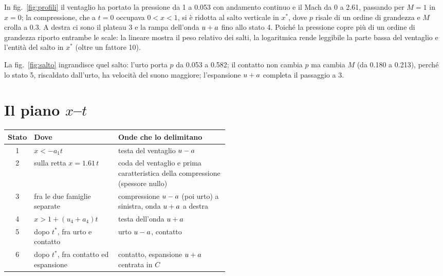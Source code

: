 
In fig.~\ref{fig:profili} il ventaglio ha portato la pressione da 1 a \num{0.053} con andamento continuo e il Mach
da 0 a \num{2.61}, passando per $M=1$ in $x=0$; la compressione, che a $t=0$ occupava $0<x<1$, si è ridotta al salto
verticale in $x^*$, dove $p$ risale di un ordine di grandezza e $M$ crolla a \num{0.3}. A destra ci sono il plateau
3 e la rampa dell'onda $u+a$ fino allo stato 4. Poiché la pressione copre più di un ordine di grandezza riporto
entrambe le scale: la lineare mostra il peso relativo dei salti, la logaritmica rende leggibile la parte bassa del
ventaglio e l'entità del salto in $x^*$ (oltre un fattore 10).


La fig.~\ref{fig:salto} ingrandisce quel salto: l'urto porta $p$ da \num{0.053} a \num{0.582}; il contatto non
cambia $p$ ma cambia $M$ (da \num{0.180} a \num{0.213}), perché lo stato 5, riscaldato dall'urto, ha velocità del
suono maggiore; l'espansione $u+a$ completa il passaggio a 3.

\section*{Il piano $x$--$t$}
\begin{table}[H]
  \centering
  \small
  \begin{tabular}{clp{0.5\linewidth}}
    \toprule
    Stato & Dove & Onde che lo delimitano \\
    \midrule
    1 & $x<-a_1t$ & testa del ventaglio $u-a$ \\
    2 & sulla retta $x=\num{1.61}\,t$ & coda del ventaglio e prima caratteristica della compressione (spessore nullo) \\
    3 & fra le due famiglie separate & compressione $u-a$ (poi urto) a sinistra, onda $u+a$ a destra \\
    4 & $x>1+(u_4+a_4)t$ & testa dell'onda $u+a$ \\
    5 & dopo $t^*$, fra urto e contatto & urto $u-a$, contatto \\
    6 & dopo $t^*$, fra contatto ed espansione & contatto, espansione $u+a$ centrata in $C$ \\
    \bottomrule
  \end{tabular}
\end{table}

